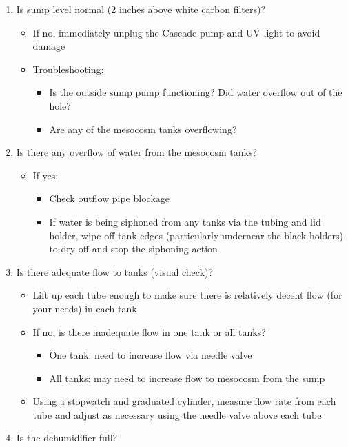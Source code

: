 \documentclass[
]{book}
\providecommand{\tightlist}{%
  \setlength{\itemsep}{0pt}\setlength{\parskip}{0pt}}
\begin{document}
\begin{enumerate}
\def\labelenumi{\arabic{enumi}.}
\tightlist
\item
  Is sump level normal (2 inches above white carbon filters)?

  \begin{itemize}
  \tightlist
  \item
    If no, immediately unplug the Cascade pump and UV light to avoid damage
  \item
    Troubleshooting:

    \begin{itemize}
    \tightlist
    \item
      Is the outside sump pump functioning? Did water overflow out of the hole?
    \item
      Are any of the mesocosm tanks overflowing?
    \end{itemize}
  \end{itemize}
\item
  Is there any overflow of water from the mesocosm tanks?

  \begin{itemize}
  \tightlist
  \item
    If yes:

    \begin{itemize}
    \tightlist
    \item
      Check outflow pipe blockage
    \item
      If water is being siphoned from any tanks via the tubing and lid holder, wipe off tank edges (particularly undernear the black holders) to dry off and stop the siphoning action
    \end{itemize}
  \end{itemize}
\item
  Is there adequate flow to tanks (visual check)?

  \begin{itemize}
  \tightlist
  \item
    Lift up each tube enough to make sure there is relatively decent flow (for your needs) in each tank
  \item
    If no, is there inadequate flow in one tank or all tanks?

    \begin{itemize}
    \tightlist
    \item
      One tank: need to increase flow via needle valve
    \item
      All tanks: may need to increase flow to mesocosm from the sump
    \end{itemize}
  \item
    Using a stopwatch and graduated cylinder, measure flow rate from each tube and adjust as necessary using the needle valve above each tube
  \end{itemize}
\item
  Is the dehumidifier full?


\end{enumerate}
\end{document}
